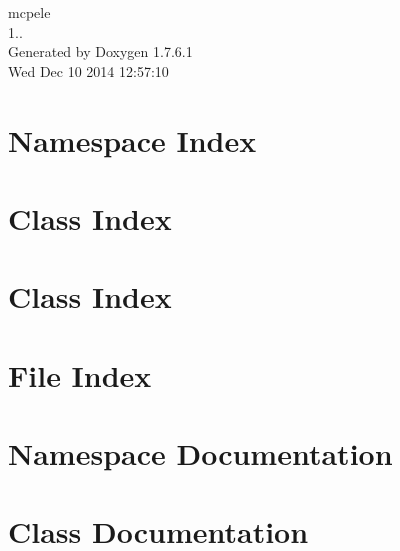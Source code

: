 \documentclass[a4paper]{book}
\begin{document}
\hypersetup{pageanchor=false,citecolor=blue}
\begin{titlepage}
\vspace*{7cm}
\begin{center}
{\Large mcpele \\[1ex]\large 1.. }\\
\vspace*{1cm}
{\large \-Generated by Doxygen 1.7.6.1}\\
\vspace*{0.5cm}
{\small Wed Dec 10 2014 12:57:10}\\
\end{center}
\end{titlepage}
\clearemptydoublepage
{}
\tableofcontents
\clearemptydoublepage
{}
\hypersetup{pageanchor=true,citecolor=blue}
\chapter{\-Namespace \-Index}

\chapter{\-Class \-Index}

\chapter{\-Class \-Index}

\chapter{\-File \-Index}

\chapter{\-Namespace \-Documentation}

\chapter{\-Class \-Documentation}






























\end{document}
